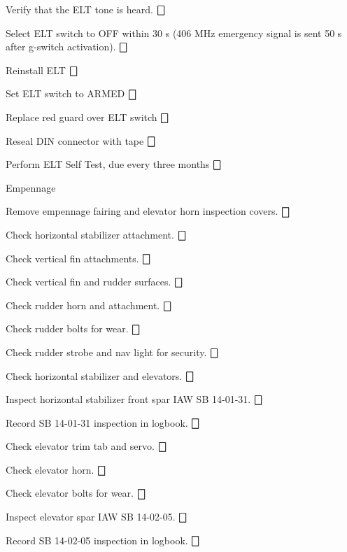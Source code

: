\begin{enumerate*}
\begin{enumerate*}
\begin{enumerate*}
\begin{enumerate*}
  		  \end{enumerate*} 
  		\item Verify that the ELT tone is heard.  \dotfill $\bigbox$
  		\item Select ELT switch to OFF within 30 s (406 MHz emergency signal is sent 50 s after g-switch activation).  \dotfill $\bigbox$
  	\end{enumerate*}
  	\item Reinstall ELT \dotfill $\bigbox$
  	\item Set ELT switch to ARMED \dotfill $\bigbox$
  	\item Replace red guard over ELT switch \dotfill $\bigbox$
  	\item Reseal DIN connector with tape \dotfill $\bigbox$
  	\item Perform ELT Self Test, due every three months \dotfill $\bigbox$
  \end{enumerate*}
	\item{Empennage} 
	\begin{enumerate*}
		\item Remove empennage fairing and elevator horn inspection covers.  \dotfill $\bigbox$
		\item Check horizontal stabilizer attachment.  \dotfill $\bigbox$
		\item Check vertical fin attachments.  \dotfill $\bigbox$
		\item Check vertical fin and rudder surfaces.  \dotfill $\bigbox$
		\item Check rudder horn and attachment.  \dotfill $\bigbox$
		\item Check rudder bolts for wear.  \dotfill $\bigbox$
		\item Check rudder strobe and nav light for security.  \dotfill $\bigbox$
		\item Check horizontal stabilizer and elevators.  \dotfill $\bigbox$
		\item Inspect horizontal stabilizer front spar IAW SB 14-01-31.  \dotfill $\bigbox$
		\item Record SB 14-01-31 inspection in logbook.  \dotfill $\bigbox$
		\item Check elevator trim tab and servo.  \dotfill $\bigbox$
		\item Check elevator horn.  \dotfill $\bigbox$
		\item Check elevator bolts for wear.  \dotfill $\bigbox$
		\item Inspect elevator spar IAW SB 14-02-05.  \dotfill $\bigbox$
		\item Record SB 14-02-05 inspection in logbook.  \dotfill $\bigbox$

\end{enumerate*}
\end{enumerate*}
